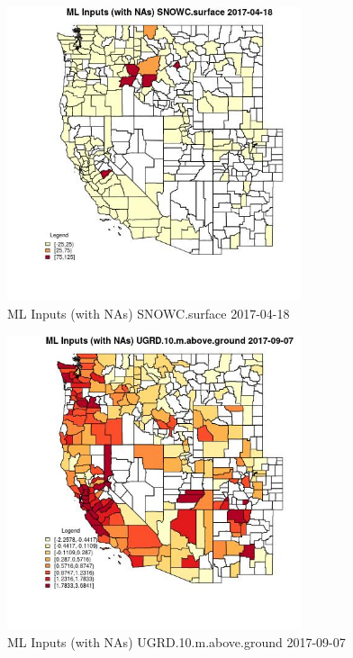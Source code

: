 \begin{figure} 
\centering  
\includegraphics[width=0.77\textwidth]{Code_Outputs/Report_ML_input_PM25_Step4_part_e_de_duplicated_aves_compiled_2019-05-20wNAs_CountySNOWCsurfaceMean2017-04-18.jpg} 
\caption{\label{fig:Report_ML_input_PM25_Step4_part_e_de_duplicated_aves_compiled_2019-05-20wNAsCountySNOWCsurfaceMean2017-04-18}ML Inputs (with NAs) SNOWC.surface 2017-04-18} 
\end{figure} 
 

\clearpage 

\begin{figure} 
\centering  
\includegraphics[width=0.77\textwidth]{Code_Outputs/Report_ML_input_PM25_Step4_part_e_de_duplicated_aves_compiled_2019-05-20wNAs_CountyUGRD10mabovegroundMean2017-09-07.jpg} 
\caption{\label{fig:Report_ML_input_PM25_Step4_part_e_de_duplicated_aves_compiled_2019-05-20wNAsCountyUGRD10mabovegroundMean2017-09-07}ML Inputs (with NAs) UGRD.10.m.above.ground 2017-09-07} 
\end{figure} 
 

